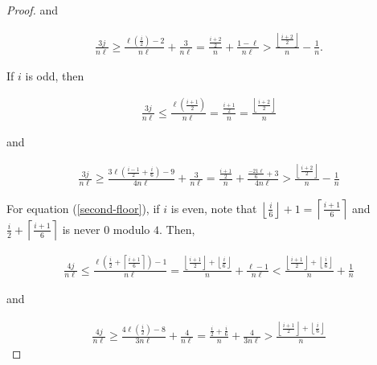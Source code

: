 \documentclass{article}
\theoremstyle{remark}
\theoremstyle{definition}
\begin{document}
\begin{proof}
\par and

\begin{align*}
    \frac{3j}{n\ell} \geq \frac{\ell \left ( \frac{i}{2} \right) - 2}{n\ell} + \frac{3}{n\ell} = \frac{\frac{i+2}{2} }{n} + \frac{1-\ell}{n\ell} > \frac{\left \lfloor \frac{i+2}{2} \right \rfloor}{n} - \frac{1}{n}.
\end{align*}

\par If $i$ is odd, then

\begin{align*}
    \frac{3j}{n\ell} \leq \frac{\ell \left( \frac{i+1}{2} \right)}{n\ell} = \frac{ \frac{i+1}{2}}{n}  = \frac{\left \lfloor \frac{i+2}{2} \right \rfloor}{n}
\end{align*}

\par and

\begin{align*}
    \frac{3j}{n\ell} \geq \frac{3\ell \left(\frac{i-1}{2} + \frac{i}{6} \right) - 9}{4n\ell} + \frac{3}{n\ell} = \frac{ \frac{i+1}{2}}{n} + \frac{\frac{-21\ell}{6}+3}{4n\ell} > \frac{\left \lfloor \frac{i+2}{2} \right \rfloor}{n} -\frac{1}{n}
\end{align*}

\par For equation (\ref{second-floor}), if $i$ is even, note that $\left \lfloor \frac{i}{6} \right \rfloor + 1 = \left \lceil \frac{i+1}{6} \right \rceil$ and $\frac{i}{2} + \left \lceil \frac{i+1}{6} \right \rceil$ is never $0$ modulo $4$. Then,

\begin{align*}
    \frac{4j}{n\ell} \leq \frac{\ell\left( \frac{i}{2} + \left \lceil \frac{i+1}{6} \right \rceil \right)-1}{n\ell} = \frac{\left \lfloor \frac{i+1}{2}\right \rfloor + \left \lfloor \frac{i}{6} \right \rfloor}{n}  +\frac{\ell-1}{n\ell} < \frac{\left \lfloor \frac{i+1}{2}\right \rfloor + \left \lfloor \frac{i}{6} \right \rfloor}{n} + \frac{1}{n}
\end{align*}

\par and

\begin{align*}
    \frac{4j}{n\ell} \geq \frac{4\ell\left(\frac{i}{2} \right)-8}{3n\ell}+\frac{4}{n\ell} = \frac{\frac{i}{2} + \frac{i}{6}}{n}+\frac{4}{3n\ell} > \frac{\left \lfloor \frac{i+1}{2}\right \rfloor + \left \lfloor \frac{i}{6} \right \rfloor}{n}
\end{align*}


\end{proof}
\end{document}
